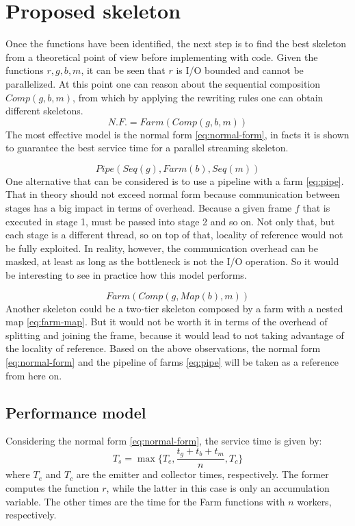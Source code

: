 \section{Proposed skeleton}
Once the functions have been identified, the next step is to find the best skeleton from a theoretical point of view before implementing with code. Given the functions $r,g,b,m$, it can be seen that $r$ is I/O bounded and cannot be parallelized. At this point one can reason about the sequential composition $Comp(g,b,m)$, from which by applying the rewriting rules one can obtain different skeletons.
\begin{equation}\label{eq:normal-form}
  N.F. = Farm(Comp(g,b,m))
\end{equation}
The most effective model is the normal form \cref{eq:normal-form}, in facts it is shown to guarantee the best service time for a parallel streaming skeleton.

\begin{equation}\label{eq:pipe}
  Pipe(Seq(g),Farm(b),Seq(m))
\end{equation}
One alternative that can be considered is to use a pipeline with a farm \cref{eq:pipe}. That in theory should not exceed normal form because communication between stages has a big impact in terms of overhead. Because a given frame $f$ that is executed in stage 1, must be passed into stage 2 and so on. Not only that, but each stage is a different thread, so on top of that, locality of reference would not be fully exploited. In reality, however, the communication overhead can be masked, at least as long as the bottleneck is not the I/O operation. So it would be interesting to see in practice how this model performs.

\begin{equation}\label{eq:farm-map}
  Farm(Comp(g,Map(b),m))
\end{equation}
Another skeleton could be a two-tier skeleton composed by a farm with a nested map \cref{eq:farm-map}. But it would not be worth it in terms of the overhead of splitting and joining the frame, because it would lead to not taking advantage of the locality of reference.
\newline
\newline
Based on the above observations, the normal form \cref{eq:normal-form} and the pipeline of farms \cref{eq:pipe} will be taken as a reference from here on.

\subsection{Performance model}
\label{sec:performance-model}
Considering the normal form \cref{eq:normal-form}, the service time is given by:
\begin{equation}\label{eq:service-time}
  T_s=\max{\{T_e, \frac{t_g + t_b + t_m}{n}, T_c\}}
\end{equation}
where $T_e$ and $T_c$ are the emitter and collector times, respectively. The former computes the function $r$, while the latter in this case is only an accumulation variable. The other times are the time for the Farm functions with $n$ workers, respectively.

